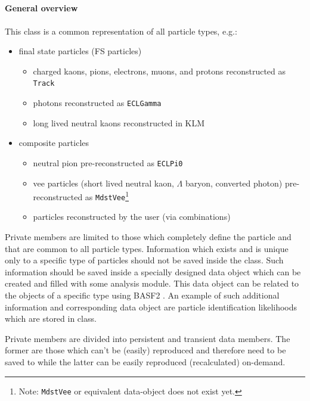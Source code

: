 \newpage
\subsection{\particle}

\paragraph{General overview}

This class is a common representation of all particle types, e.g.:
\begin{itemize}
 \item final state particles (FS particles)
 \begin{itemize}
  \item charged kaons, pions, electrons, muons, and protons reconstructed as {\tt Track}
  \item photons reconstructed as {\tt ECLGamma}
  \item long lived neutral kaons reconstructed in KLM
 \end{itemize}
 \item composite particles
 \begin{itemize}
  \item neutral pion pre-reconstructed as {\tt ECLPi0} 
  \item vee particles (short lived neutral kaon, $\Lambda$ baryon, converted photon) pre-reconstructed as {\tt MdstVee}\footnote{Note: 
  {\tt MdstVee} or equivalent data-object does not exist yet.}
 \item particles reconstructed by the user (via combinations)
 \end{itemize}
\end{itemize}

Private members are limited to those which completely define the particle and that are common to all particle types. Information which
exists and is unique only to a specific type of particles should not be saved inside the \particle class. Such information should be 
saved inside a specially designed data object which can be created and filled with some analysis module. This data object can be
related to the \particle objects of a specific type using BASF2 \relation. An example of such additional information and corresponding
data object are particle identification likelihoods which are stored in \pidLikelihood class. 

Private members are divided into persistent and transient data members. The former are those which can't be (easily) reproduced and therefore need
to be saved to \mudst while the latter can be easily reproduced (recalculated) on-demand.

